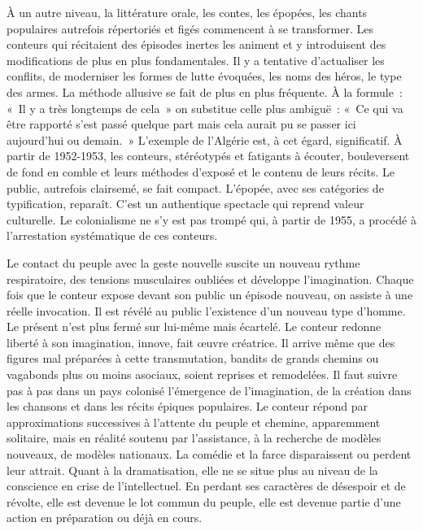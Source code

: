 \documentclass[french,twoside]{book} %
\begin{document}
 À un autre niveau, la littérature orale, les contes, les épopées, les chants populaires autrefois répertoriés et figés commencent à se transformer. Les conteurs qui récitaient des épisodes inertes les animent et y introduisent des modifications de plus en plus fondamentales. Il y a tentative d’actualiser les conflits, de moderniser les formes de lutte évoquées, les noms des héros, le type des armes. La méthode allusive se fait de plus en plus fréquente. À la formule : « Il y a très longtemps de cela » on substitue celle plus ambiguë : « Ce qui va être rapporté s’est passé quelque part mais cela aurait pu se passer ici aujourd’hui ou demain. » L’exemple de l’Algérie est, à cet égard, significatif. À partir de 1952-1953, les conteurs, stéréotypés et fatigants à écouter, bouleversent de fond en comble et leurs méthodes d’exposé et le contenu de leurs récits. Le public, autrefois clairsemé, se fait compact. L’épopée, avec ses catégories de typification, reparaît. C’est un authentique spectacle qui reprend valeur culturelle. Le colonialisme ne s’y est pas trompé qui, à partir de 1955, a procédé à l’arrestation systématique de ces conteurs.\par
\bigbreak
\noindent Le contact du peuple avec la geste nouvelle suscite un nouveau rythme respiratoire, des tensions musculaires oubliées et développe l’imagination. Chaque fois que le conteur expose devant son public un épisode nouveau, on assiste à une réelle invocation. Il est révélé au public l’existence d’un nouveau type d’homme. Le présent n’est plus fermé sur lui-même mais écartelé. Le conteur redonne liberté à son imagination, innove, fait œuvre créatrice. Il arrive même que des figures mal préparées à cette transmutation, bandits de grands chemins ou vagabonds plus ou moins asociaux, soient reprises et remodelées. Il faut suivre pas à pas dans un pays colonisé l’émergence de l’imagination, de la création dans les chansons et dans les récits épiques populaires. Le conteur répond par approximations successives à l’attente du peuple et chemine, apparemment solitaire, mais en réalité soutenu par l’assistance, à la recherche de modèles nouveaux, de modèles nationaux. La comédie et la farce disparaissent ou perdent leur attrait. Quant à la dramatisation, elle ne se   situe plus au niveau de la conscience en crise de l’intellectuel. En perdant ses caractères de désespoir et de révolte, elle est devenue le lot commun du peuple, elle est devenue partie d’une action en préparation ou déjà en cours.\par
\bigbreak
\end{document}
